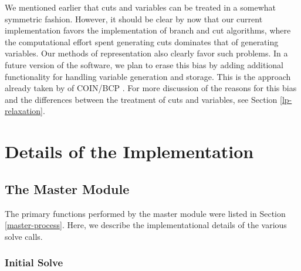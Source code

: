 We mentioned earlier that cuts and variables can be treated in a
somewhat symmetric fashion. However, it should be clear by now
that our current implementation favors the implementation of
branch and cut algorithms, where the computational effort spent
generating cuts dominates that of generating variables. Our methods of
representation also clearly favor such problems. In a future version
of the software, we plan to erase this bias by adding additional
functionality for handling variable generation and storage. This is
the approach already taken by of COIN/BCP \cite{coin-or}. For more
discussion of the reasons for this bias and the differences between
the treatment of cuts and variables, see Section \ref{lp-relaxation}.

\section{Details of the Implementation}
\label{modules}

\subsection{The Master Module}
\label{master}

The primary functions performed by the master module were listed in
Section \ref{master-process}. Here, we describe the implementational details of
the various solve calls.  

\subsubsection{Initial Solve}\label{initial_solve}

